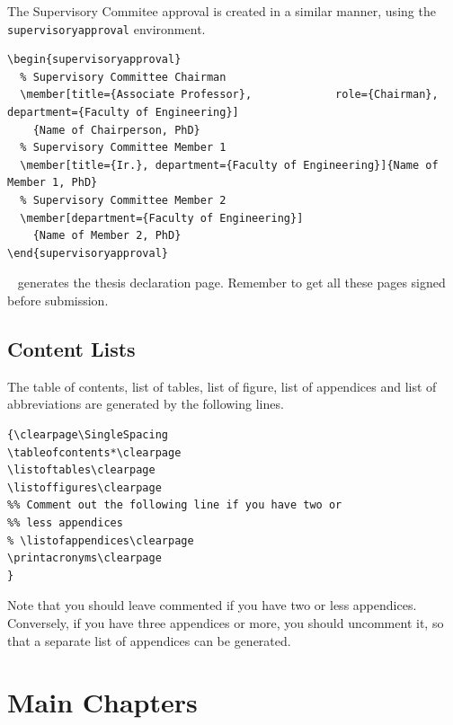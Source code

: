 \documentclass[a4paper,nofonts,raggedright,titlepage,openany]{tufte-book}
\begin{document}
The Supervisory Commitee approval is created in a similar manner, using the \texttt{supervisoryapproval} environment. 

\begin{verbatim}
\begin{supervisoryapproval}
  % Supervisory Committee Chairman
  \member[title={Associate Professor},             role={Chairman},                           department={Faculty of Engineering}]
    {Name of Chairperson, PhD}
  % Supervisory Committee Member 1
  \member[title={Ir.}, department={Faculty of Engineering}]{Name of Member 1, PhD}
  % Supervisory Committee Member 2
  \member[department={Faculty of Engineering}]
    {Name of Member 2, PhD}
\end{supervisoryapproval}

\end{verbatim}

\texttt{\declarationpage
} generates the thesis declaration page. Remember to get all these pages signed before submission.

\subsection{Content Lists}
\label{sec:content:lists}

The table of contents, list of tables, list of figure, list of appendices  and list of abbreviations are generated by the following lines.

\begin{verbatim}
{\clearpage\SingleSpacing
\tableofcontents*\clearpage
\listoftables\clearpage
\listoffigures\clearpage
%% Comment out the following line if you have two or 
%% less appendices
% \listofappendices\clearpage
\printacronyms\clearpage
}
\end{verbatim}

Note that you should leave \texttt{\listofappendices} commented if you have two or less appendices.  Conversely,  if you have three appendices or more, you should uncomment it, so that a separate list of appendices can be generated.


\section{Main Chapters}
\end{document}
